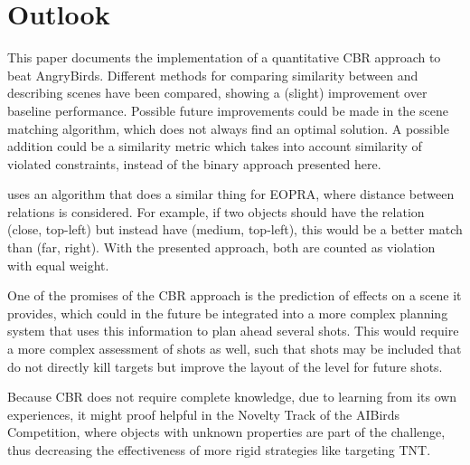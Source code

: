 \section{Outlook}\label{sec:outlook}
This paper documents the implementation of a quantitative \ac{CBR} approach to beat AngryBirds. Different methods for comparing similarity between and describing scenes have been compared, showing a (slight) improvement over baseline performance.
Possible future improvements could be made in the scene matching algorithm, which does not always find an optimal solution.
A possible addition could be a similarity metric which takes into account similarity of violated constraints, instead of the binary approach presented here.

\cite{QCBR} uses an algorithm that does a similar thing for \ac{EOPRA}, where distance between relations is considered. For example, if two objects should have the relation (close, top-left) but instead have (medium, top-left), this would be a better match than (far, right). With the presented approach, both are counted as violation with equal weight.

One of the promises of the \ac{CBR} approach is the prediction of effects on a scene it provides, which could in the future be integrated into a more complex planning system that uses this information to plan ahead several shots.
This would require a more complex assessment of shots as well, such that shots may be included that do not directly kill targets but improve the  layout of the level for future shots.

Because \ac{CBR} does not require complete knowledge, due to learning from its own experiences, it might proof helpful in the Novelty Track of the AIBirds Competition, where objects with unknown properties are part of the challenge, thus decreasing the effectiveness of more rigid strategies like targeting TNT.
